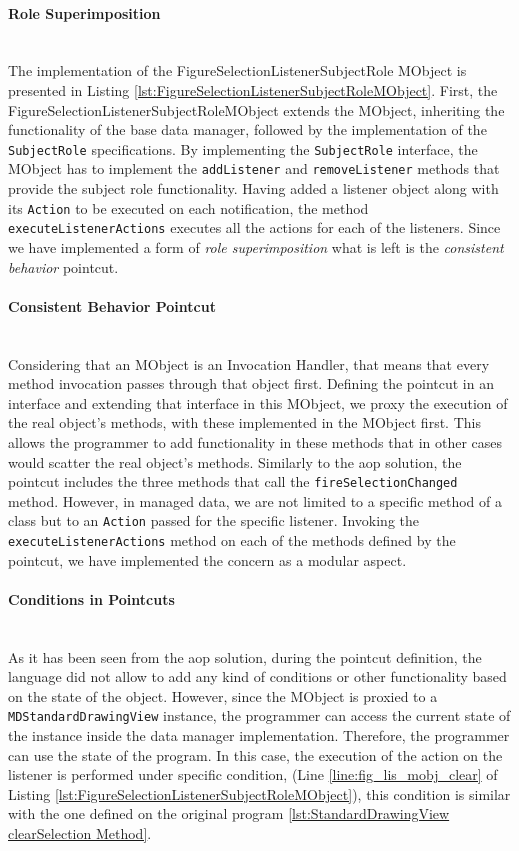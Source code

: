 \paragraph{Role Superimposition}\mbox{}\\
The implementation of the FigureSelectionListenerSubjectRole MObject is presented in Listing \ref{lst:FigureSelectionListenerSubjectRoleMObject}.
First, the FigureSelectionListenerSubjectRoleMObject extends the MObject, inheriting the functionality of the base data manager, followed by the implementation of the \texttt{SubjectRole} specifications.
By implementing the \texttt{SubjectRole} interface, the MObject has to implement the \texttt{addListener} and \texttt{removeListener} methods that provide the subject role functionality.
Having added a listener object along with its \texttt{Action} to be executed on each notification, the method \texttt{executeListenerActions} executes all the actions for each of the listeners.
Since we have implemented a form of \textit{role superimposition} what is left is the \textit{consistent behavior} pointcut.

\paragraph{Consistent Behavior Pointcut}\mbox{}\\
Considering that an MObject is an Invocation Handler, that means that every method invocation passes through that object first.
Defining the pointcut in an interface and extending that interface in this MObject, we proxy the execution of the real object's methods, with these implemented in the MObject first.
This allows the programmer to add functionality in these methods that in other cases would scatter the real object's methods.
Similarly to the \ac{aop} solution, the pointcut includes the three methods that call the \texttt{fireSelectionChanged} method.
However, in managed data, we are not limited to a specific method of a class but to an \texttt{Action} passed for the specific listener.
Invoking the \texttt{executeListenerActions} method on each of the methods defined by the pointcut, we have implemented the concern as a modular aspect.

\paragraph{Conditions in Pointcuts}\mbox{}\\
As it has been seen from the \ac{aop} solution, during the pointcut definition, the language did not allow to add any kind of conditions or other functionality based on the state of the object.
However, since the MObject is proxied to a \texttt{MDStandardDrawingView} instance, the programmer can access the current state of the instance inside the data manager implementation.
Therefore, the programmer can use the state of the program.
In this case, the execution of the action on the listener is performed under specific condition, (Line \ref{line:fig_lis_mobj_clear} of Listing \ref{lst:FigureSelectionListenerSubjectRoleMObject}), this condition is similar with the one defined on the original program \ref{lst:StandardDrawingView clearSelection Method}.

